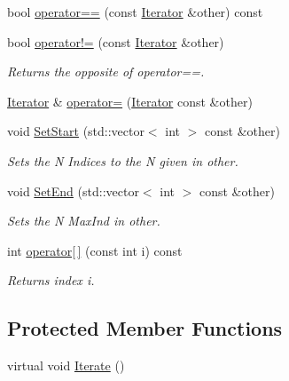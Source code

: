 \begin{DoxyCompactItemize}
bool \hyperlink{classJKBuilder_1_1Iterator_a1ea001976a5bc8ae8dc365e2a912b59a}{operator==} (const \hyperlink{classJKBuilder_1_1Iterator}{Iterator} \&other) const 
\item 
bool \hyperlink{classJKBuilder_1_1Iterator_a8c06af8ae0d9d1614ae9f81629275926}{operator!=} (const \hyperlink{classJKBuilder_1_1Iterator}{Iterator} \&other)
\begin{DoxyCompactList}\small\item\em Returns the opposite of operator==. \item\end{DoxyCompactList}\item 
\hyperlink{classJKBuilder_1_1Iterator}{Iterator} \& \hyperlink{classJKBuilder_1_1Iterator_ae6f4f24e1855d2aaf89a8a60a9f1521b}{operator=} (\hyperlink{classJKBuilder_1_1Iterator}{Iterator} const \&other)
\item 
void \hyperlink{classJKBuilder_1_1Iterator_aa83de505e29125c1d3ac7bb1b13ca15a}{SetStart} (std::vector$<$ int $>$ const \&other)
\begin{DoxyCompactList}\small\item\em Sets the N Indices to the N given in other. \item\end{DoxyCompactList}\item 
void \hyperlink{classJKBuilder_1_1Iterator_aad84ec668b5f41210db34c540aaa31fc}{SetEnd} (std::vector$<$ int $>$ const \&other)
\begin{DoxyCompactList}\small\item\em Sets the N MaxInd in other. \item\end{DoxyCompactList}\item 
int \hyperlink{classJKBuilder_1_1Iterator_a74247cf730a06b23fcb1ec64e5596b25}{operator\mbox{[}$\,$\mbox{]}} (const int i) const 
\begin{DoxyCompactList}\small\item\em Returns index i. \item\end{DoxyCompactList}\end{DoxyCompactItemize}
\subsection*{Protected Member Functions}
\begin{DoxyCompactItemize}
\item 
virtual void \hyperlink{classJKBuilder_1_1Iterator_a7874a07e98b52f4f147cde6f39353bae}{Iterate} ()
\end{DoxyCompactItemize}
